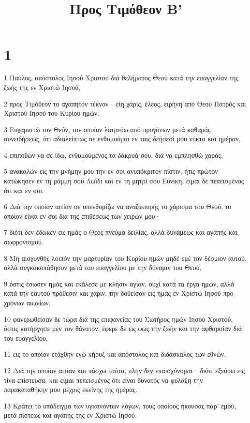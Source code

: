 

\title{Προς Τιμόθεον Β'}


\chapter{1}

\par 1 Παύλος, απόστολος Ιησού Χριστού διά θελήματος Θεού κατά την επαγγελίαν της ζωής της εν Χριστώ Ιησού,
\par 2 προς Τιμόθεον το αγαπητόν τέκνον· είη χάρις, έλεος, ειρήνη από Θεού Πατρός και Χριστού Ιησού του Κυρίου ημών.
\par 3 Ευχαριστώ τον Θεόν, τον οποίον λατρεύω από προγόνων μετά καθαράς συνειδήσεως, ότι αδιαλείπτως σε ενθυμούμαι εν ταις δεήσεσί μου νύκτα και ημέραν,
\par 4 επιποθών να σε ίδω, ενθυμούμενος τα δάκρυά σου, διά να εμπλησθώ χαράς,
\par 5 ανακαλών εις την μνήμην μου την εν σοι ανυπόκριτον πίστιν, ήτις πρώτον κατώκησεν εν τη μάμμη σου Λωΐδι και εν τη μητρί σου Ευνίκη, είμαι δε πεπεισμένος ότι και εν σοι.
\par 6 Διά την οποίαν αιτίαν σε υπενθυμίζω να αναζωπυρής το χάρισμα του Θεού, το οποίον είναι εν σοι διά της επιθέσεως των χειρών μου·
\par 7 διότι δεν έδωκεν εις ημάς ο Θεός πνεύμα δειλίας, αλλά δυνάμεως και αγάπης και σωφρονισμού.
\par 8 Μη αισχυνθής λοιπόν την μαρτυρίαν του Κυρίου ημών μηδέ εμέ τον δέσμιον αυτού, αλλά συγκακοπάθησον μετά του ευαγγελίου με την δύναμιν του Θεού,
\par 9 όστις έσωσεν ημάς και εκάλεσε με κλήσιν αγίαν, ουχί κατά τα έργα ημών, αλλά κατά την εαυτού πρόθεσιν και χάριν, την δοθείσαν εις ημάς εν Χριστώ Ιησού προ χρόνων αιωνίων,
\par 10 φανερωθείσαν δε τώρα διά της επιφανείας του Σωτήρος ημών Ιησού Χριστού, όστις κατήργησε μεν τον θάνατον, έφερε δε εις φως την ζωήν και την αφθαρσίαν διά του ευαγγελίου,
\par 11 εις το οποίον ετάχθην εγώ κήρυξ και απόστολος και διδάσκαλος των εθνών.
\par 12 Διά την οποίαν αιτίαν και πάσχω ταύτα, πλην δεν επαισχύνομαι· διότι εξεύρω εις τίνα επίστευσα, και είμαι πεπεισμένος ότι είναι δυνατός να φυλάξη την παρακαταθήκην μου μέχρις εκείνης της ημέρας.
\par 13 Κράτει το υπόδειγμα των υγιαινόντων λόγων, τους οποίους ήκουσας παρ' εμού, μετά πίστεως και αγάπης της εν Χριστώ Ιησού.
